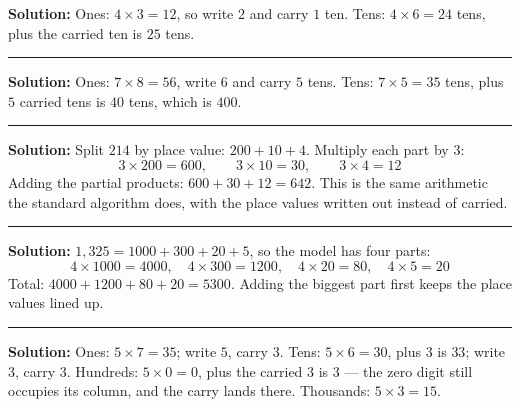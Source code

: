 \documentclass[12pt]{article}
\begin{document}



\textbf{Solution:} Ones: $4 \times 3 = 12$, so write $2$ and carry $1$ ten. Tens:
$4 \times 6 = 24$ tens, plus the carried ten is $25$ tens. 

\vspace{0.12cm}\noindent\rule{\linewidth}{0.2pt}


\textbf{Solution:} Ones: $7 \times 8 = 56$, write $6$ and carry $5$ tens. Tens:
$7 \times 5 = 35$ tens, plus $5$ carried tens is $40$ tens, which is $400$. 

\vspace{0.12cm}\noindent\rule{\linewidth}{0.2pt}


\textbf{Solution:} Split $214$ by place value: $200 + 10 + 4$. Multiply each part by $3$:
\[ 3 \times 200 = \boxed{600}, \qquad 3 \times 10 = \boxed{30}, \qquad 3 \times 4 = \boxed{12} \]
Adding the partial products: $600 + 30 + 12 = 642$. This is the same arithmetic the standard
algorithm does, with the place values written out instead of carried. 

\vspace{0.12cm}\noindent\rule{\linewidth}{0.2pt}


\textbf{Solution:} $1{,}325 = 1000 + 300 + 20 + 5$, so the model has four parts:
\[ 4 \times 1000 = \boxed{4000}, \quad 4 \times 300 = \boxed{1200}, \quad 4 \times 20 = \boxed{80},
   \quad 4 \times 5 = \boxed{20} \]
Total: $4000 + 1200 + 80 + 20 = 5300$. Adding the biggest part first keeps the place values lined up.

\vspace{0.12cm}\noindent\rule{\linewidth}{0.2pt}


\textbf{Solution:} Ones: $5 \times 7 = 35$; write $5$, carry $3$. Tens: $5 \times 6 = 30$, plus $3$ is
$33$; write $3$, carry $3$. Hundreds: $5 \times 0 = 0$, plus the carried $3$ is $3$ --- the zero digit
still occupies its column, and the carry lands there. Thousands: $5 \times 3 = 15$. 
\end{document}
